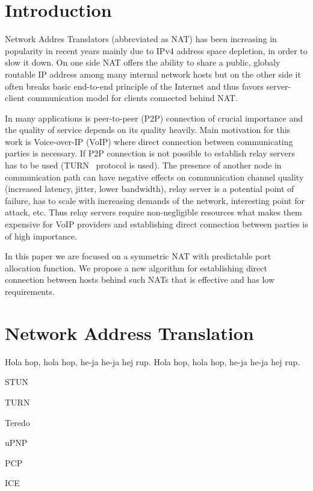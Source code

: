 \documentclass[twoside]{article}
\begin{document}
\begin{multicols}{2}

\section{Introduction}
Network Addres Translators (abbreviated as NAT) has been increasing in popularity in recent years 
mainly due to IPv4 address space depletion, in order to slow it down. On one side NAT offers
the ability to share a public, globaly routable IP address among many internal network hosts but on 
the other side it often breaks basic end-to-end principle of the Internet and thus favors server-client 
communication model for clients connected behind NAT.

In many applications is peer-to-peer (P2P) connection of crucial importance and the quality of service depends on 
its quality heavily. Main motivation for this work is Voice-over-IP (VoIP) where direct connection 
between communicating parties is necessary. If P2P connection is not possible to establish relay 
servers has to be used (TURN~\citep{rfc5766} protocol is used). The presence 
of another node in communication path can have negative effects on communication channel quality 
(increased latency, jitter, lower bandwidth), relay server is a potential point of failure, 
has to scale with increasing demands of the network, interesting point for attack, etc.
Thus relay servers require non-negligible resources what makes them expensive for VoIP providers and
establishing direct connection between parties is of high importance.

In this paper we are focused on a symmetric NAT with predictable port allocation function. We propose a 
new algorithm for establishing direct connection between hosts behind such NATs that is effective and 
has low requirements.

\section{Network Address Translation}


Hola hop, hola hop, he-ja he-ja hej rup. Hola hop, hola hop, he-ja he-ja hej rup.
\begin{compactitem}
\item STUN~\citep{rfc5389}
\item TURN~\citep{rfc5766}
\item Teredo~\citep{rfc4380}
\item uPNP~\citep{rfc6970}
\item PCP~\citep{rfc6887}
\item ICE~\citep{rfc5245}
\end{compactitem}



\end{multicols}
\end{document}
